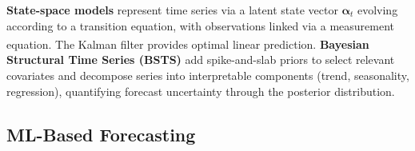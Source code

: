\begin{tcbitemize}[ skin=sectionraster ]
    \tcbitem[title=State-Space and Bayesian Structural Time Series, raster multicolumn=3]
    \textbf{State-space models} represent time series via a latent state vector $\boldsymbol{\alpha}_t$ evolving according to a transition equation, with observations linked via a measurement equation\textsuperscript{\cite[][pp.~293--310]{hyndmanForecastingPrinciples2021}}.
    The Kalman filter provides optimal linear prediction.
    \textbf{Bayesian Structural Time Series (BSTS)} add spike-and-slab priors to select relevant covariates and decompose series into interpretable components (trend, seasonality, regression), quantifying forecast uncertainty through the posterior distribution.

\end{tcbitemize}

\subsection{ML-Based Forecasting}

